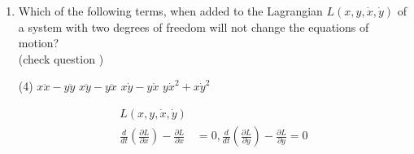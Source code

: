 \begin{enumerate}
\begin{answer}
\begin{align*}
	\text{Lagrangian equation of motion; }&\frac{d}{d t}\left(\frac{\partial L}{\partial \dot{r}}\right)-\frac{\partial L}{\partial r}=0\\
	\left(m_{1}+m_{2}\right) \ddot{r}-m_{1} r \dot{\theta}^{2}+m_{2} g&=0
	\intertext{Hence angular momentum is conserved}
	m_{1} r^{2} \dot{\theta}&=m_{1} r_{0}^{2} \dot{\theta}_{0} \Rightarrow \dot{\theta}=\frac{r_{0}^{2} \dot{\theta}_{0}}{r^{2}}\\
	\text{For circular motion }&m r_{0} \dot{\theta}_{0}^{2}=m_{2} g\\
	\text{	so }r \dot{\theta}^{2}&=\frac{m_{2}}{m_{1}}\left(\frac{r_{0}}{r}\right)^{3} g\\
	\left(m_{1}+m_{2}\right) \ddot{r}-m_{2}\left(\frac{r_{0}}{r}\right)^{3} g+m_{2} g&=0\\
	\text{Put }r&=r_{0}+\in \ddot{r}=\ddot{\epsilon}\\
	\intertext{$\left(m_{1}+m_{2}\right) \ddot{\in}-m_{2}\left(\frac{r_{0}}{r_{0}+\epsilon}\right)^{3} g+m_{2} g\Rightarrow\left(m_{1}+m_{2}\right) \ddot{\in}-m_{2} r_{0}^{3}\left(r_{0}+\epsilon\right)^{-3} g+m_{2} g$}\\
	\left(m_{1}+m_{2}\right) \ddot{\star}-m_{2} r_{0}^{3} g r_{0}^{-3}\left(1+\frac{\epsilon}{r_{0}}\right)^{-3}+m_{2} g&=0\\
	\left(m_{1}+m_{2}\right) \ddot+\frac{m_{2} 3 \epsilon}{r_{0}}&=0 \Rightarrow \omega=\sqrt{\frac{3 m_{2} g}{\left(m_{1}+m_{2}\right) r_{0}}}
	\end{align*}
	So the correct answer is \textbf{Option (D)}
\end{answer}	
	\item Which of the following terms, when added to the Lagrangian $L(x, y, \dot{x}, \dot{y})$ of a system with two degrees of freedom will not change the equations of motion?\\
	(check question )
	{}
	\begin{tasks}(4)
		\task[\textbf{A.}] $x \ddot{x}-y \ddot{y}$
		\task[\textbf{B.}] $x \ddot{y}-y \ddot{x}$
		\task[\textbf{C.}] $x \dot{y}-y \dot{x}$
		\task[\textbf{D.}] $y \dot{x}^{2}+x \dot{y}^{2}$ 
	\end{tasks}
\begin{answer}
	\begin{align*}
	L(x, y, \dot{x}, \dot{y})\\
	\frac{d}{d t}\left(\frac{\partial L}{\partial \dot{x}}\right)-\frac{\partial L}{\partial x}&=0, \frac{d}{d t}\left(\frac{\partial L}{\partial \dot{y}}\right)-\frac{\partial L}{\partial y}=0\\

\end{align*}
\end{answer}
\end{enumerate}
